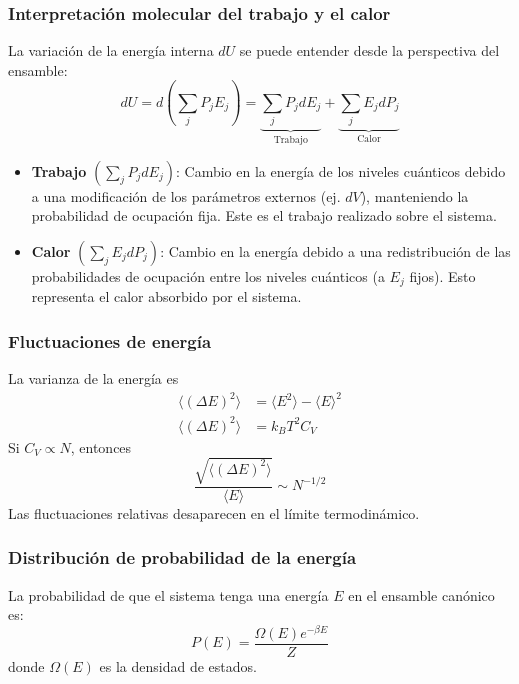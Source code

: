 \documentclass[]{article}
\numberwithin{equation}{section}
\newcommand{\0}{\textcolor{gray}{0}}
\begin{document}

\subsubsection{Interpretación molecular del trabajo y el calor}
La variación de la energía interna \(dU\) se puede entender desde la perspectiva del ensamble:
\begin{equation}
	dU = d\left(\sum_{j}P_j E_j\right) = \underbrace{\sum_{j}P_j dE_j}_{\mathrm{Trabajo}} + \underbrace{\sum_{j}E_j dP_j}_{\mathrm{Calor}}
\end{equation}
\begin{itemize}
	\item \textbf{Trabajo} \(\left(\sum_{j}P_j dE_j\right)\): Cambio en la energía de los niveles cuánticos debido a una modificación de los parámetros externos (ej. \(dV\)), manteniendo la probabilidad de ocupación 	fija. Este es el trabajo realizado sobre el sistema.
	\item \textbf{Calor} \(\left(\sum_{j}E_j dP_j\right)\): Cambio en la energía debido a una redistribución de las probabilidades de ocupación entre los niveles cuánticos (a \(E_j\) fijos). Esto representa el calor absorbido por el sistema.
\end{itemize}

\subsubsection{Fluctuaciones de energía}
La varianza de la energía es
\begin{align}
	\langle\left(\Delta E\right)^2\rangle  &= \langle E^2\rangle - \langle E \rangle^2\nonumber\\
	\langle\left(\Delta E\right)^2\rangle &= k_B T^2 C_V
\end{align}
Si \(C_V \propto N\), entonces
\begin{equation}
	\frac{\sqrt{\langle\left(\Delta E\right)^2\rangle}}{\langle E\rangle} \sim N^{-1/2}
\end{equation}
Las fluctuaciones relativas desaparecen en el límite termodinámico.

\subsubsection{Distribución de probabilidad de la energía}
La probabilidad de que el sistema tenga una energía \(E\) en el ensamble canónico es:
\begin{equation}
	P(E) = \frac{\Omega(E)e^{-\beta E}}{Z}
\end{equation}
donde \(\Omega(E)\) es la densidad de estados.
\end{document}
